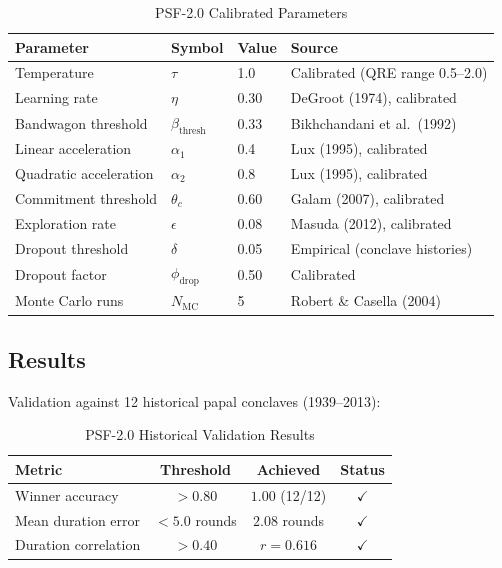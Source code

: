 \begin{table}[htbp]
\centering
\caption{PSF-2.0 Calibrated Parameters}
\label{tab:bp-params}
\renewcommand{\arraystretch}{1.2}
\small
\begin{tabular}{@{}llll@{}}
\toprule
\textbf{Parameter} & \textbf{Symbol} & \textbf{Value} & \textbf{Source} \\
\midrule
Temperature & $\tau$ & 1.0 & Calibrated (QRE range 0.5--2.0) \\
Learning rate & $\eta$ & 0.30 & DeGroot (1974), calibrated \\
Bandwagon threshold & $\beta_{\text{thresh}}$ & 0.33 & Bikhchandani et al.\ (1992) \\
Linear acceleration & $\alpha_1$ & 0.4 & Lux (1995), calibrated \\
Quadratic acceleration & $\alpha_2$ & 0.8 & Lux (1995), calibrated \\
Commitment threshold & $\theta_c$ & 0.60 & Galam (2007), calibrated \\
Exploration rate & $\epsilon$ & 0.08 & Masuda (2012), calibrated \\
Dropout threshold & $\delta$ & 0.05 & Empirical (conclave histories) \\
Dropout factor & $\phi_{\text{drop}}$ & 0.50 & Calibrated \\
Monte Carlo runs & $N_{\text{MC}}$ & 5 & Robert \& Casella (2004) \\
\bottomrule
\end{tabular}
\end{table}

\subsection{Results}

Validation against 12 historical papal conclaves (1939--2013):

\begin{table}[htbp]
\centering
\caption{PSF-2.0 Historical Validation Results}
\label{tab:bp-results}
\renewcommand{\arraystretch}{1.2}
\small
\begin{tabular}{@{}lccc@{}}
\toprule
\textbf{Metric} & \textbf{Threshold} & \textbf{Achieved} & \textbf{Status} \\
\midrule
Winner accuracy & $> 0.80$ & $1.00$ (12/12) & $\checkmark$ \\
Mean duration error & $< 5.0$ rounds & $2.08$ rounds & $\checkmark$ \\
Duration correlation & $> 0.40$ & $r = 0.616$ & $\checkmark$ \\
\bottomrule
\end{tabular}
\end{table}


